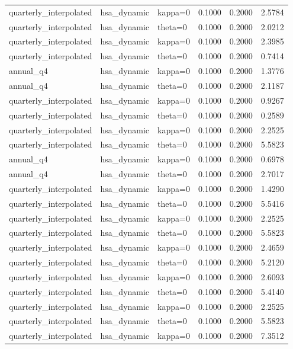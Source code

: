 \begin{tabular}{lllrrr}
quarterly\_interpolated & hsa\_dynamic & kappa=0 & 0.1000 & 0.2000 & 2.5784 \\
quarterly\_interpolated & hsa\_dynamic & theta=0 & 0.1000 & 0.2000 & 2.0212 \\
quarterly\_interpolated & hsa\_dynamic & kappa=0 & 0.1000 & 0.2000 & 2.3985 \\
quarterly\_interpolated & hsa\_dynamic & theta=0 & 0.1000 & 0.2000 & 0.7414 \\
annual\_q4 & hsa\_dynamic & kappa=0 & 0.1000 & 0.2000 & 1.3776 \\
annual\_q4 & hsa\_dynamic & theta=0 & 0.1000 & 0.2000 & 2.1187 \\
quarterly\_interpolated & hsa\_dynamic & kappa=0 & 0.1000 & 0.2000 & 0.9267 \\
quarterly\_interpolated & hsa\_dynamic & theta=0 & 0.1000 & 0.2000 & 0.2589 \\
quarterly\_interpolated & hsa\_dynamic & kappa=0 & 0.1000 & 0.2000 & 2.2525 \\
quarterly\_interpolated & hsa\_dynamic & theta=0 & 0.1000 & 0.2000 & 5.5823 \\
annual\_q4 & hsa\_dynamic & kappa=0 & 0.1000 & 0.2000 & 0.6978 \\
annual\_q4 & hsa\_dynamic & theta=0 & 0.1000 & 0.2000 & 2.7017 \\
quarterly\_interpolated & hsa\_dynamic & kappa=0 & 0.1000 & 0.2000 & 1.4290 \\
quarterly\_interpolated & hsa\_dynamic & theta=0 & 0.1000 & 0.2000 & 5.5416 \\
quarterly\_interpolated & hsa\_dynamic & kappa=0 & 0.1000 & 0.2000 & 2.2525 \\
quarterly\_interpolated & hsa\_dynamic & theta=0 & 0.1000 & 0.2000 & 5.5823 \\
quarterly\_interpolated & hsa\_dynamic & kappa=0 & 0.1000 & 0.2000 & 2.4659 \\
quarterly\_interpolated & hsa\_dynamic & theta=0 & 0.1000 & 0.2000 & 5.2120 \\
quarterly\_interpolated & hsa\_dynamic & kappa=0 & 0.1000 & 0.2000 & 2.6093 \\
quarterly\_interpolated & hsa\_dynamic & theta=0 & 0.1000 & 0.2000 & 5.4140 \\
quarterly\_interpolated & hsa\_dynamic & kappa=0 & 0.1000 & 0.2000 & 2.2525 \\
quarterly\_interpolated & hsa\_dynamic & theta=0 & 0.1000 & 0.2000 & 5.5823 \\
quarterly\_interpolated & hsa\_dynamic & kappa=0 & 0.1000 & 0.2000 & 7.3512 \\

\end{tabular}
